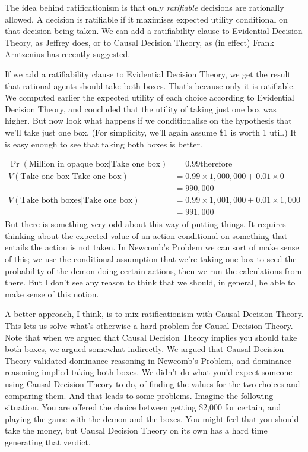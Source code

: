 The idea behind ratificationism is that only \textit{ratifiable} decisions are rationally allowed. A decision is ratifiable if it maximises expected utility conditional on that decision being taken. We can add a ratifiability clause to Evidential Decision Theory, as Jeffrey does, or to Causal Decision Theory, as (in effect) Frank Arntzenius has recently suggested. 

If we add a ratifiability clause to Evidential Decision Theory, we get the result that rational agents should take both boxes. That's because only it is ratifiable. We computed earlier the expected utility of each choice according to Evidential Decision Theory, and concluded that the utility of taking just one box was higher. But now look what happens if we conditionalise on the hypothesis that we'll take just one box. (For simplicity, we'll again assume \$1 is worth 1 util.) It is easy enough to see that taking both boxes is better.

\begin{align*}
\Pr(\text{Million in opaque box} | \text{Take one box}) &= 0.99 \text{therefore} \\
V(\text{Take one box} | \text{Take one box}) &= 0.99 \times 1,000,000 + 0.01 \times 0 \\
&= 990,000 \\
V(\text{Take both boxes} | \text{Take one box}) &= 0.99 \times 1,001,000 + 0.01 \times 1,000 \\
&= 991,000 
\end{align*} But there is something very odd about this way of putting things. It requires thinking about the expected value of an action conditional on something that entails the action is not taken. In Newcomb's Problem we can sort of make sense of this; we use the conditional assumption that we're taking one box to seed the probability of the demon doing certain actions, then we run the calculations from there. But I don't see any reason to think that we should, in general, be able to make sense of this notion.

A better approach, I think, is to mix ratificationism with Causal Decision Theory.  This lets us solve what's otherwise a hard problem for Causal Decision Theory. Note that when we argued that Causal Decision Theory implies you should take both boxes, we argued somewhat indirectly. We argued that Causal Decision Theory validated dominance reasoning in Newcomb's Problem, and dominance reasoning implied taking both boxes. We didn't do what you'd expect someone using Causal Decision Theory to do, of finding the values for the two choices and comparing them. And that leads to some problems. Imagine the following situation. You are offered the choice between getting \$2,000 for certain, and playing the game with the demon and the boxes. You might feel that you should take the money, but Causal Decision Theory on its own has a hard time generating that verdict.

